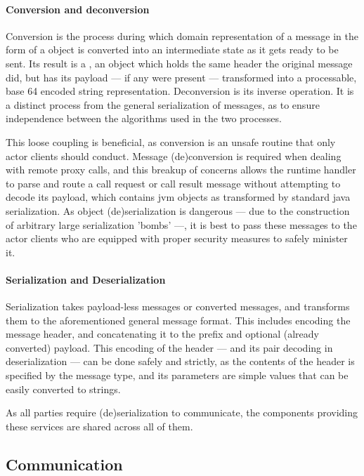 			\paragraph{Conversion and deconversion}
		
			Conversion is the process during which domain representation of a message in the form of a  object is converted into an intermediate state as it gets ready to be sent. Its result is a , an object which holds the same header the original message did, but has its payload --- if any were present --- transformed into a processable, base 64 encoded string representation. Deconversion is its inverse operation. It is a distinct process from the general serialization of messages, as to ensure independence between the algorithms used in the two processes.
			
			This loose coupling is beneficial, as conversion is an unsafe routine that only actor clients should conduct. Message (de)conversion is required when dealing with remote proxy calls, and this breakup of concerns allows the runtime handler to parse and route a call request or call result message without attempting to decode its payload, which contains jvm objects as transformed by standard java serialization. As object (de)serialization is dangerous --- due to the construction of arbitrary large serialization 'bombs' ---, it is best to pass these messages to the actor clients who are equipped with proper security measures to safely minister it.

			\paragraph{Serialization and Deserialization}
			
			Serialization takes payload-less messages or converted messages, and transforms them to the aforementioned general message format. This includes encoding the message header, and concatenating it to the prefix and optional (already converted) payload. This encoding of the header --- and its pair decoding in deserialization --- can be done safely and strictly, as the contents of the header is specified by the message type, and its parameters are simple values that can be easily converted to strings.
			
			As all parties require (de)serialization to communicate, the components providing these services are shared across all of them.

		\subsection{Communication}
		
